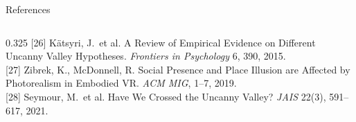\documentclass[aspectratio=169,10pt]{beamer}
\begin{document}
\begin{frame}{References}
\begin{columns}[T]
\begin{column}{0.325\textwidth}
      [26] K\"atsyri, J.\ et al. A Review of Empirical Evidence on Different Uncanny Valley Hypotheses. \textit{Frontiers in Psychology} 6, 390, 2015.\\[0.3em]
      [27] Zibrek, K., McDonnell, R. Social Presence and Place Illusion are Affected by Photorealism in Embodied VR. \textit{ACM MIG}, 1--7, 2019.\\[0.3em]
      [28] Seymour, M.\ et al. Have We Crossed the Uncanny Valley? \textit{JAIS} 22(3), 591--617, 2021.\\[0.3em]
    \end{column}
  \end{columns}
\end{frame}

\end{document}
